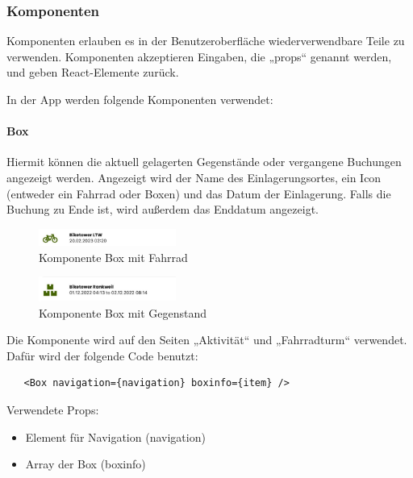\subsubsection{Komponenten}
Komponenten erlauben es in der Benutzeroberfläche wiederverwendbare Teile zu verwenden. Komponenten akzeptieren Eingaben, die „props“ genannt werden, und geben React-Elemente zurück. 


In der App werden folgende Komponenten verwendet:

\paragraph{Box}

Hiermit können die aktuell gelagerten Gegenstände oder vergangene Buchungen angezeigt werden. Angezeigt wird der Name des Einlagerungsortes, ein Icon (entweder ein Fahrrad oder Boxen) und das Datum der Einlagerung. Falls die Buchung zu Ende ist, wird außerdem das Enddatum angezeigt.\\

\begin{figure}[H]
  \centering
  \includegraphics[width=0.4\textwidth]{images/app-screenshots/boxwithbike.png}
  \caption{Komponente Box mit Fahrrad}
  \label{fig:boxwithbike}
\end{figure}
\begin{figure}[H]
  \centering
  \includegraphics[width=0.4\textwidth]{images/app-screenshots/boxwithitem.png}
  \caption{Komponente Box mit Gegenstand}
  \label{fig:boxwithitem}
\end{figure}

Die Komponente wird auf den Seiten „Aktivität“ und „Fahrradturm“ verwendet. Dafür wird der folgende Code benutzt:\\

\begin{verbatim}
   <Box navigation={navigation} boxinfo={item} />
\end{verbatim}

Verwendete Props:
\begin{itemize}
  \item Element für Navigation (navigation)
  \item Array der Box (boxinfo)
\end{itemize}


